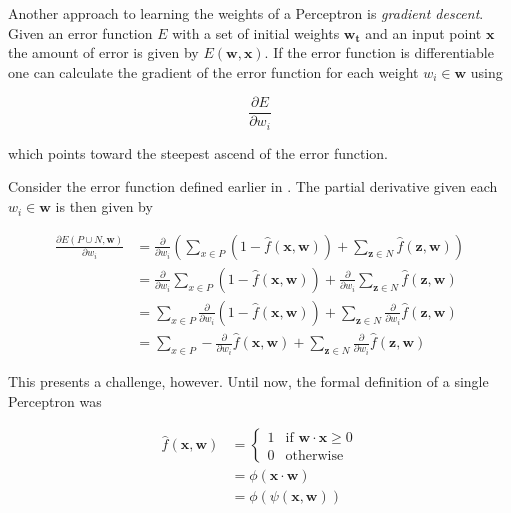 Another approach to learning the weights of a Perceptron is \textit{gradient descent}.
Given an error function $E$ with a set of initial weights $\bm{w_t}$ and an input point $\bm{x}$ the amount of error is given by $E(\bm{w}, \bm{x})$.
If the error function is differentiable one can calculate the gradient of the error function for each weight $w_i \in \bm{w}$ using

\begin{equation}
    \frac{\partial E}{\partial w_i}
\end{equation}

which points toward the steepest ascend of the error function.

Consider the error function defined earlier in .
The partial derivative given each $w_i \in \bm{w}$ is then given by

\begin{equation}
    \label{eq:error-derivative-1}
    \begin{split}
        \frac{\partial E(P \cup N, \bm{w})}{\partial w_i}
        &= \frac{\partial }{\partial w_i} \left( \sum_{x \in P} (1 - \hat{f}(\bm{x},\bm{w})) + \sum_{\bm{z} \in N} \hat{f}(\bm{z},\bm{w}) \right) \\
        &= \frac{\partial }{\partial w_i} \sum_{x \in P} (1 - \hat{f}(\bm{x},\bm{w})) + \frac{\partial }{\partial w_i} \sum_{\bm{z} \in N} \hat{f}(\bm{z},\bm{w}) \\
        &= \sum_{x \in P} \frac{\partial }{\partial w_i} (1 - \hat{f}(\bm{x},\bm{w})) + \sum_{\bm{z} \in N} \frac{\partial }{\partial w_i} \hat{f}(\bm{z},\bm{w}) \\
        &= \sum_{x \in P} - \frac{\partial }{\partial w_i} \hat{f}(\bm{x},\bm{w}) + \sum_{\bm{z} \in N} \frac{\partial }{\partial w_i} \hat{f}(\bm{z},\bm{w})
    \end{split}
\end{equation}

This presents a challenge, however.
Until now, the formal definition of a single Perceptron was

\begin{equation}
    \begin{split}
        \hat{f}(\bm{x}, \bm{w})
        &=
            \begin{cases}
                1 & \text{if } \bm{w} \cdot \bm{x} \geq 0 \\
                0 & \text{otherwise}
            \end{cases}
        \\
        &= \phi(\bm{x} \cdot \bm{w})
        \\
        &= \phi(\psi(\bm{x}, \bm{w}))
    \end{split}
\end{equation}

